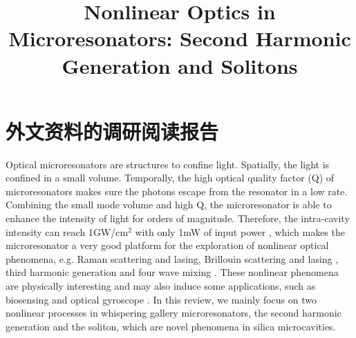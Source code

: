 \chapter{外文资料的调研阅读报告}
\label{cha:engorg}

\title{Nonlinear Optics in Microresonators: Second Harmonic Generation and Solitons}


Optical microresonators are structures to confine light. Spatially, the light is confined in a small volume. Temporally, the high optical quality factor (Q) of microresonators makes sure the photons escape from the resonator in a low rate. Combining the small mode volume and high Q, the microresonator is able to enhance the intensity of light for orders of magnitude. Therefore, the intra-cavity intensity can reach 1GW/cm$^2$ with only 1mW of input power \cite{vahala2003optical, cai2000fiber, kippenberg2004ultralow}, which makes the microresonator a very good platform for the exploration of nonlinear optical phenomena, e.g. Raman scattering and lasing\cite{spillane2002ultralow, cai2000fiber, kippenberg2004ultralow}, Brillouin scattering and lasing \cite{li2012characterization, li2013microwave, li2014low, loh2015dual}, third harmonic generation \cite{carmon2007visible, farnesi2014optical} and four wave mixing \cite{kippenberg2004kerr}. These nonlinear phenomena are physically interesting and may also induce some applications, such as biosensing \cite{ozdemir2014highly} and optical gyroscope \cite{li2015microresonator}. In this review, we mainly focus on two nonlinear processes in whispering gallery microresonators, the second harmonic generation and the soliton, which are novel phenomena in silica microcavities. 


